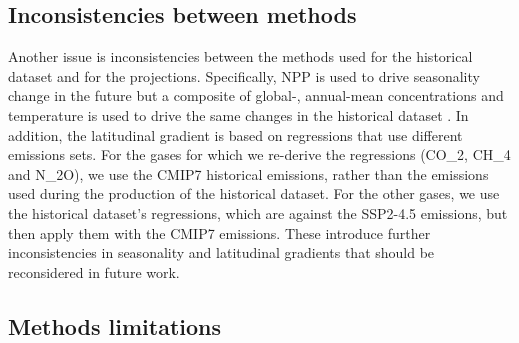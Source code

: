 \subsection{Inconsistencies between methods}
\label{ssec:discussion-inconsistencies-methods}

Another issue is inconsistencies between the methods used for the historical dataset and for the projections.
Specifically, NPP is used to drive seasonality change in the future
but a composite of global-, annual-mean concentrations and temperature is used to drive the same changes in the historical dataset \citep{nicholls_historical-ghgs_2026}.
In addition, the latitudinal gradient is based on regressions that use different emissions sets.
For the gases for which we re-derive the regressions (CO_2, CH_4 and N_2O),
we use the CMIP7 historical emissions, rather than the emissions used during the production of the historical dataset.
For the other gases, we use the historical dataset's regressions,
which are against the SSP2-4.5 emissions,
but then apply them with the CMIP7 emissions.
These introduce further inconsistencies in seasonality and latitudinal gradients
that should be reconsidered in future work.

\subsection{Methods limitations}
\label{ssec:discussion-methods-limitations}

